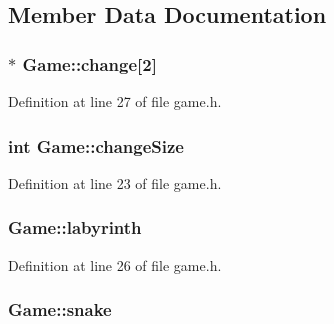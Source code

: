 \subsection{Member Data Documentation}
\hypertarget{class_game_a87f9c54e60a724de2644769cd917dbce}{
\subsubsection[{change}]{$\ast$ Game\-::change\mbox{[}2\mbox{]}\hspace{0.3cm}{\ttfamily [private]}}}\label{class_game_a87f9c54e60a724de2644769cd917dbce}


Definition at line 27 of file game.\-h.

\hypertarget{class_game_ae959d08e508fcef98dd07a2b9cd82e65}{
\subsubsection[{change\-Size}]{\setlength{\rightskip}{0pt plus 5cm}int Game\-::change\-Size\hspace{0.3cm}{\ttfamily [private]}}}\label{class_game_ae959d08e508fcef98dd07a2b9cd82e65}


Definition at line 23 of file game.\-h.

\hypertarget{class_game_a92148f2659c019b331e9da7deadbd8bc}{
\subsubsection[{labyrinth}]{ Game\-::labyrinth\hspace{0.3cm}{\ttfamily [private]}}}\label{class_game_a92148f2659c019b331e9da7deadbd8bc}


Definition at line 26 of file game.\-h.

\hypertarget{class_game_ab77bfcc312425811000819791ea7668e}{
\subsubsection[{snake}]{ Game\-::snake\hspace{0.3cm}{\ttfamily [private]}}}\label{class_game_ab77bfcc312425811000819791ea7668e}


